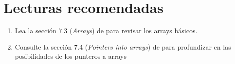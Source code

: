 \section{Lecturas recomendadas}

\begin{enumerate}

\item Lea la sección 7.3 (\emph{Arrays}) de
      \cppbook{}
      para revisar los arrays básicos.

\item Consulte la sección 7.4 (\emph{Pointers into arrays}) de
      \cppbook{}
      para profundizar en las posibilidades de los punteros a arrays

\end{enumerate}
